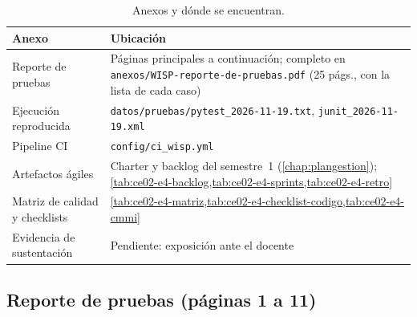 \begin{table}[H]
\centering
\caption{Anexos y dónde se encuentran.}
\label{tab:ce02-e4-anexos}
\small
\begin{tabularx}{\textwidth}{L{4.6cm}X}
\toprule
\textbf{Anexo} & \textbf{Ubicación} \\
\midrule
Reporte de pruebas & Páginas principales a continuación; completo en \texttt{anexos/WISP-reporte-de-pruebas.pdf} (25 págs., con la lista de cada caso) \\
Ejecución reproducida & \texttt{datos/pruebas/pytest\_2026-11-19.txt}, \texttt{junit\_2026-11-19.xml} \\
Pipeline CI & \texttt{config/ci\_wisp.yml} \\
Artefactos ágiles & Charter y backlog del semestre~1 (\cref{chap:plangestion}); \cref{tab:ce02-e4-backlog,tab:ce02-e4-sprints,tab:ce02-e4-retro} \\
Matriz de calidad y checklists & \cref{tab:ce02-e4-matriz,tab:ce02-e4-checklist-codigo,tab:ce02-e4-cmmi} \\
Evidencia de sustentación & Pendiente: exposición ante el docente \\
\bottomrule
\end{tabularx}
\end{table}

\subsection*{Reporte de pruebas (páginas 1 a 11)}
\label{sec:ce02-e4-anexo-reporte}


